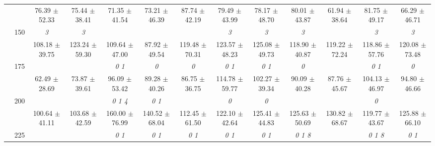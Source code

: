 \begin{table}[h]
{\begin{tabular}{
        ccccccccccccc}
 & & \cellcolor[HTML]{EFEFEF} 76.39 $\pm$ 52.33& \cellcolor[HTML]{EFEFEF} 75.44 $\pm$ 38.41& \cellcolor[HTML]{EFEFEF} 71.35 $\pm$ 41.54& \cellcolor[HTML]{EFEFEF} 73.21 $\pm$ 46.39& \cellcolor[HTML]{EFEFEF} 87.74 $\pm$ 42.19& \cellcolor[HTML]{EFEFEF} 79.49 $\pm$ 43.99& \cellcolor[HTML]{EFEFEF} 78.17 $\pm$ 48.70& \cellcolor[HTML]{EFEFEF} 80.01 $\pm$ 43.87& \cellcolor[HTML]{EFEFEF} 61.94 $\pm$ 38.64& \cellcolor[HTML]{EFEFEF} 81.75 $\pm$ 49.17& \cellcolor[HTML]{EFEFEF} 66.29 $\pm$ 46.71 \\ 
 & \multirow{2}{*}{150}& \textit{ 3 }& \textit{ 3 }& & & & \textit{ 3 }& \textit{ 3 }& \textit{ 3 }& & \textit{ 3 }& \textit{ 3 } \\ 
 & & 108.18 $\pm$ 39.75& 123.24 $\pm$ 59.30& 109.64 $\pm$ 47.00& 87.92 $\pm$ 49.54& 119.48 $\pm$ 70.31& 123.57 $\pm$ 48.23& 125.08 $\pm$ 49.73& 118.90 $\pm$ 40.87& 119.22 $\pm$ 72.24& 118.86 $\pm$ 57.76& 120.08 $\pm$ 73.48 \\ 
 & \multirow{2}{*}{175}& \cellcolor[HTML]{EFEFEF} & \cellcolor[HTML]{EFEFEF} & \cellcolor[HTML]{EFEFEF} \textit{ 0 1 }& \cellcolor[HTML]{EFEFEF} \textit{ 0 }& \cellcolor[HTML]{EFEFEF} \textit{ 0 }& \cellcolor[HTML]{EFEFEF} \textit{ 0 1 }& \cellcolor[HTML]{EFEFEF} \textit{ 0 1 }& \cellcolor[HTML]{EFEFEF} \textit{ 0 }& \cellcolor[HTML]{EFEFEF} & \cellcolor[HTML]{EFEFEF} \textit{ 0 1 }& \cellcolor[HTML]{EFEFEF} \textit{ 0 } \\ 
 & & \cellcolor[HTML]{EFEFEF} 62.49 $\pm$ 28.69& \cellcolor[HTML]{EFEFEF} 73.87 $\pm$ 39.61& \cellcolor[HTML]{EFEFEF} 96.09 $\pm$ 53.42& \cellcolor[HTML]{EFEFEF} 89.28 $\pm$ 40.26& \cellcolor[HTML]{EFEFEF} 86.75 $\pm$ 36.75& \cellcolor[HTML]{EFEFEF} 114.78 $\pm$ 59.77& \cellcolor[HTML]{EFEFEF} 102.27 $\pm$ 39.34& \cellcolor[HTML]{EFEFEF} 90.09 $\pm$ 40.28& \cellcolor[HTML]{EFEFEF} 87.76 $\pm$ 45.67& \cellcolor[HTML]{EFEFEF} 104.13 $\pm$ 46.97& \cellcolor[HTML]{EFEFEF} 94.80 $\pm$ 46.66 \\ 
 & \multirow{2}{*}{200}& & & \textit{ 0 1 4 }& \textit{ 0 1 }& & \textit{ 0 }& \textit{ 0 }& & & \textit{ 0 }&  \\ 
 & & 100.64 $\pm$ 41.11& 103.68 $\pm$ 42.59& 160.00 $\pm$ 76.99& 140.52 $\pm$ 68.04& 112.45 $\pm$ 61.50& 122.10 $\pm$ 42.64& 125.41 $\pm$ 44.83& 125.63 $\pm$ 50.69& 130.82 $\pm$ 68.67& 119.77 $\pm$ 43.67& 125.88 $\pm$ 66.10 \\ 
 & \multirow{2}{*}{225}& \cellcolor[HTML]{EFEFEF} & \cellcolor[HTML]{EFEFEF} & \cellcolor[HTML]{EFEFEF} \textit{ 0 1 }& \cellcolor[HTML]{EFEFEF} \textit{ 0 1 }& \cellcolor[HTML]{EFEFEF} \textit{ 0 1 }& \cellcolor[HTML]{EFEFEF} \textit{ 0 1 }& \cellcolor[HTML]{EFEFEF} \textit{ 0 1 }& \cellcolor[HTML]{EFEFEF} \textit{ 0 1 8 }& \cellcolor[HTML]{EFEFEF} & \cellcolor[HTML]{EFEFEF} \textit{ 0 1 8 }& \cellcolor[HTML]{EFEFEF} \textit{ 0 1 } \\ 

\end{tabular}}
\end{table}
